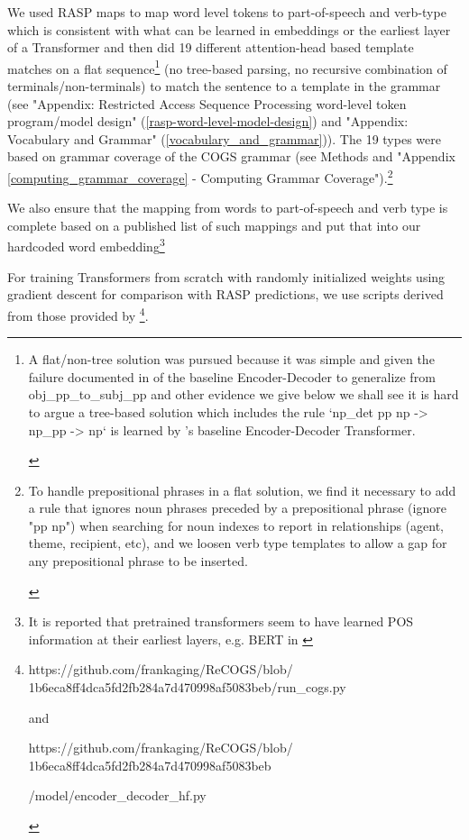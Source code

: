 \documentclass[11pt]{article}
\begin{document}
We used RASP maps to map word level tokens to part-of-speech and verb-type which is consistent with what can be learned in embeddings or the earliest layer of a Transformer \cite{tenney2019bertrediscoversclassicalnlp} and then did 19 different attention-head based template matches on a flat sequence\footnote{\begin{footnotesize}A flat/non-tree solution was pursued because it was simple and given the failure documented in \cite{Wu2023} of the baseline Encoder-Decoder to generalize from obj\_pp\_to\_subj\_pp and other evidence we give below we shall see it is hard to argue a tree-based solution which includes the rule `np\_det pp np -> np\_pp -> np` is learned by \cite{Wu2023}'s baseline Encoder-Decoder Transformer.\end{footnotesize}} (no tree-based parsing, no recursive combination of terminals/non-terminals) to match the sentence to a template in the grammar (see "Appendix: Restricted Access Sequence Processing word-level token program/model design" (\ref{rasp-word-level-model-design}) and  "Appendix: Vocabulary and Grammar" (\ref{vocabulary_and_grammar})). The 19 types were based on \cite{fuzzingbook2023:GrammarCoverageFuzzer} grammar coverage of the COGS grammar (see Methods and "Appendix \ref{computing_grammar_coverage} - Computing Grammar Coverage").\footnote{\begin{footnotesize}To handle prepositional phrases in a flat solution, we find it necessary to add a rule that ignores noun phrases preceded by a prepositional phrase (ignore "pp np") when searching for noun indexes to report in relationships (agent, theme, recipient, etc), and we loosen verb type templates to allow a gap for any prepositional phrase to be inserted.\end{footnotesize}}

We also ensure that the mapping from words to part-of-speech and verb type is complete based on a published list of such mappings and put that into our hardcoded word embedding\footnote{It is reported that pretrained transformers seem to have learned POS information at their earliest layers, e.g. BERT in \cite{tenney2019bertrediscoversclassicalnlp}}

For training Transformers from scratch with randomly initialized weights using gradient descent for comparison with RASP predictions, we use scripts derived from those provided by \cite{Wu2023}\footnote{\begin{footnotesize}https://github.com/frankaging/ReCOGS/blob/
1b6eca8ff4dca5fd2fb284a7d470998af5083beb/run\_cogs.py

and

https://github.com/frankaging/ReCOGS/blob/
1b6eca8ff4dca5fd2fb284a7d470998af5083beb

/model/encoder\_decoder\_hf.py 
\end{footnotesize}
}.
\end{document}
